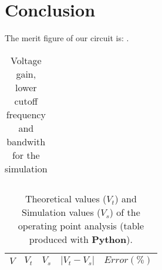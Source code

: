 \section{Conclusion}
\label{sec:conclusion}


The merit figure of our circuit is: .

\begin{table}[H]
  \centering
  \begin{tabular}{|c|c|}
    \hline
        
        \hline
  \end{tabular}
  \caption{Voltage gain, lower cutoff frequency and bandwith for the simulation}
  \label{tab:res_sim}
\end{table}

\begin{table}[H]
  \centering
  \begin{tabular}{|c|c|c|c|c|}
    \hline
        $V$ & $V_t$ & $V_s$ & $|V_t-V_s|$ & $Error (\%)$ \\
        \hline
        \hline
        
        \hline
  \end{tabular}
  \caption{Theoretical values ($V_t$) and Simulation values ($V_s$) of the operating point analysis (table produced with {\bf Python}).}
  \label{error1_res}
\end{table}

